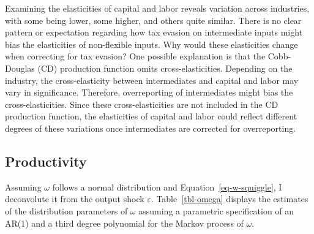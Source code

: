 \documentclass[
  12pt]{article}
\theoremstyle{definition}
\theoremstyle{remark}
\begin{document}
Examining the elasticities of capital and labor reveals variation across
industries, with some being lower, some higher, and others quite
similar. There is no clear pattern or expectation regarding how tax
evasion on intermediate inputs might bias the elasticities of
non-flexible inputs. Why would these elasticities change when correcting
for tax evasion? One possible explanation is that the Cobb-Douglas (CD)
production function omits cross-elasticities. Depending on the industry,
the cross-elasticity between intermediates and capital and labor may
vary in significance. Therefore, overreporting of intermediates might
bias the cross-elasticities. Since these cross-elasticities are not
included in the CD production function, the elasticities of capital and
labor could reflect different degrees of these variations once
intermediates are corrected for overreporting.

\subsection{Productivity}\label{productivity}

Assuming \(\omega\) follows a normal distribution and
Equation~\ref{eq-w-squiggle}, I deconvolute it from the output shock
\(\varepsilon\). Table~\ref{tbl-omega} displays the estimates of the
distribution parameters of \(\omega\) assuming a parametric
specification of an AR(1) and a third degree polynomial for the Markov
process of \(\omega\).

\begin{table}

\caption{\label{tbl-omega}Estimates Omega Distribution by Industry after
Deconvoluting from the Output Shock.}


\end{table}%
\end{document}
